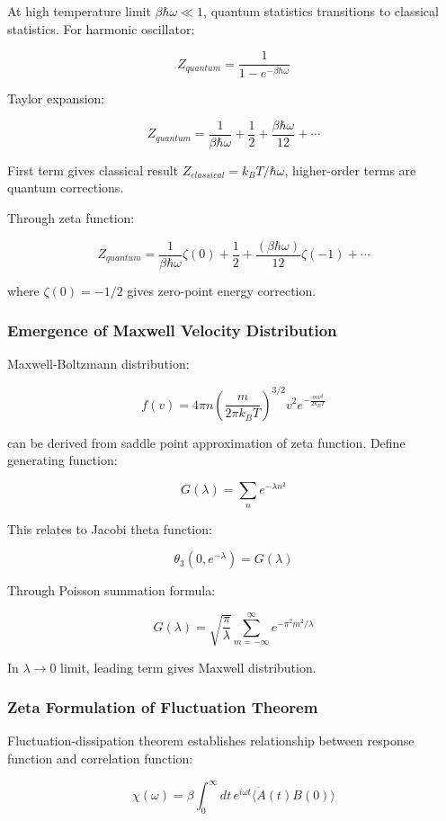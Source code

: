 \documentclass[12pt,a4paper]{article}
\begin{document}
At high temperature limit $\beta\hbar\omega \ll 1$, quantum statistics transitions to classical statistics. For harmonic oscillator:

$$Z_{quantum} = \frac{1}{1-e^{-\beta\hbar\omega}}$$

Taylor expansion:

$$Z_{quantum} = \frac{1}{\beta\hbar\omega} + \frac{1}{2} + \frac{\beta\hbar\omega}{12} + \cdots$$

First term gives classical result $Z_{classical} = k_BT/\hbar\omega$, higher-order terms are quantum corrections.

Through zeta function:

$$Z_{quantum} = \frac{1}{\beta\hbar\omega} \zeta(0) + \frac{1}{2} + \frac{(\beta\hbar\omega)}{12}\zeta(-1) + \cdots$$

where $\zeta(0) = -1/2$ gives zero-point energy correction.

\subsubsection{Emergence of Maxwell Velocity Distribution}

Maxwell-Boltzmann distribution:

$$f(v) = 4\pi n \left(\frac{m}{2\pi k_BT}\right)^{3/2} v^2 e^{-\frac{mv^2}{2k_BT}}$$

can be derived from saddle point approximation of zeta function. Define generating function:

$$G(\lambda) = \sum_{n} e^{-\lambda n^2}$$

This relates to Jacobi theta function:

$$\theta_3(0, e^{-\lambda}) = G(\lambda)$$

Through Poisson summation formula:

$$G(\lambda) = \sqrt{\frac{\pi}{\lambda}} \sum_{m=-\infty}^{\infty} e^{-\pi^2 m^2/\lambda}$$

In $\lambda \to 0$ limit, leading term gives Maxwell distribution.

\subsubsection{Zeta Formulation of Fluctuation Theorem}

Fluctuation-dissipation theorem establishes relationship between response function and correlation function:

$$\chi(\omega) = \beta \int_0^{\infty} dt \, e^{i\omega t} \langle \dot{A}(t) B(0) \rangle$$
\end{document}
